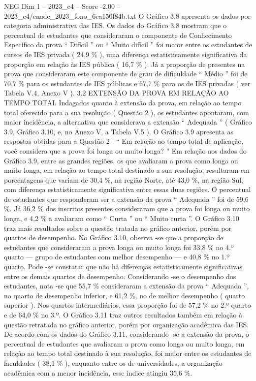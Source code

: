\begin{textsample}{NEG Dim 1 – 2023\_c4 – Score -2.00 – 2023\_c4/enade\_2023\_fono\_6ca150f84b.txt}
O Gráfico 3.8 apresenta os dados por categoria administrativa das IES.
Os dados do Gráfico 3.8 mostram que o percentual de estudantes que consideraram o componente de Conhecimento Específico da prova “ Difícil ” ou “ Muito difícil ” foi maior entre os estudantes de cursos de IES privada ( 24,9 \% ), uma diferença estatisticamente significativa da proporção em relação às IES pública ( 16,7 \% ).
Já a proporção de presentes na prova que consideraram este componente de grau de dificuldade “ Médio ” foi de 70,7 \% para os estudantes de IES públicas e 67,7 \% para os de IES privadas ( ver Tabela V.4, Anexo V ). 3.2 EXTENSÃO DA PROVA EM RELAÇÃO AO TEMPO TOTAL Indagados quanto à extensão da prova, em relação ao tempo total oferecido para a sua resolução ( Questão 2 ), os estudantes apontaram, com maior incidência, a alternativa que considerava a extensão “ Adequada ” ( Gráfico 3.9, Gráfico 3.10, e, no Anexo V, a Tabela V.5 ).
O Gráfico 3.9 apresenta as respostas obtidas para a Questão 2 : “ Em relação ao tempo total de aplicação, você considera que a prova foi longa ou muito longa? ” Em relação aos dados do Gráfico 3.9, entre as grandes regiões, os que avaliaram a prova como longa ou muito longa, em relação ao tempo total destinado a sua resolução, resultaram em porcentagens que variam de 30,4 \%, na região Norte, até 43,0 \%, na região Sul, com diferença estatisticamente significativa entre essas duas regiões.
O percentual de estudantes que responderam ser a extensão da prova “ Adequada ” foi de 59,6 \%.
Já 36,2 \% dos inscritos presentes consideraram que a prova foi longa ou muito longa, e 4,2 \% a avaliaram como “ Curta ” ou “ Muito curta ”.
O Gráfico 3.10 traz mais resultados sobre a questão tratada no gráfico anterior, porém por quartos de desempenho.
No Gráfico 3.10, observa -se que a proporção de estudantes que consideraram a prova longa ou muito longa foi 33,8 \% no 4.º quarto — grupo de estudantes com melhor desempenho — e 40,8 \% no 1.º quarto.
Pode -se constatar que não há diferenças estatisticamente significativas entre os demais quartos de desempenho.
Considerando -se o desempenho dos estudantes, nota -se que 55,7 \% consideraram a extensão da prova “ Adequada ”, no quarto de desempenho inferior, e 61,2 \%, no de melhor desempenho ( quarto superior ).
Nos quartos intermediários, essa proporção foi de 57,2 \% no 2.º quarto e de 64,0 \% no 3.º.
O Gráfico 3.11 traz outros resultados também em relação à questão retratada no gráfico anterior, porém por organização acadêmica das IES.
De acordo com os dados do Gráfico 3.11, considerando -se a extensão da prova, o percentual de estudantes que avaliaram a prova como longa ou muito longa, em relação ao tempo total destinado à sua resolução, foi maior entre os estudantes de faculdades ( 38,1 \% ), enquanto entre os de universidades, a organização acadêmica com a menor incidência, esse índice atingiu 35,6 \%.

\end{textsample}
